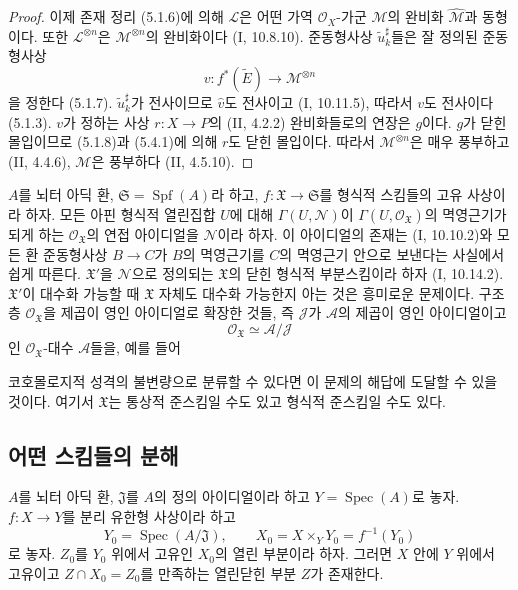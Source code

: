\begin{proof}
이제 존재 정리 (5.1.6)에 의해 $\mathcal L$은 어떤 가역
$\mathcal O_X$-가군 $\mathcal M$의 완비화
$\widehat{\mathcal M}$과 동형이다. 또한
$\mathcal L^{\otimes n}$은 $\mathcal M^{\otimes n}$의 완비화이다
(I, 10.8.10). 준동형사상 $\widetilde u_k^\sharp$들은 잘 정의된
준동형사상
\[
v:f^*(\widetilde E)\longrightarrow\mathcal M^{\otimes n}
\]
을 정한다 (5.1.7). $\widetilde u_k^\sharp$가 전사이므로
$\widehat v$도 전사이고 (I, 10.11.5), 따라서 $v$도 전사이다
(5.1.3). $v$가 정하는 사상 $r:X\to P$의 (II, 4.2.2)
완비화들로의 연장은 $g$이다. $g$가 닫힌 몰입이므로 (5.1.8)과
(5.4.1)에 의해 $r$도 닫힌 몰입이다. 따라서
$\mathcal M^{\otimes n}$은 매우 풍부하고 (II, 4.4.6),
$\mathcal M$은 풍부하다 (II, 4.5.10).
\end{proof}

\begin{remark}[5.4.6]
\label{III.5.4.6-fr}
$A$를 뇌터 아딕 환, $\mathfrak S=\operatorname{Spf}(A)$라 하고,
$f:\mathfrak X\to\mathfrak S$를 형식적 스킴들의 고유 사상이라
하자. 모든 아핀 형식적 열린집합 $U$에 대해
$\Gamma(U,\mathcal N)$이
$\Gamma(U,\mathcal O_{\mathfrak X})$의 멱영근기가 되게 하는
$\mathcal O_{\mathfrak X}$의 연접 아이디얼을 $\mathcal N$이라
하자. 이 아이디얼의 존재는 (I, 10.10.2)와 모든 환 준동형사상
$B\to C$가 $B$의 멱영근기를 $C$의 멱영근기 안으로 보낸다는
사실에서 쉽게 따른다. $\mathfrak X'$을 $\mathcal N$으로 정의되는
$\mathfrak X$의 닫힌 형식적 부분스킴이라 하자 (I, 10.14.2).
$\mathfrak X'$이 대수화 가능할 때 $\mathfrak X$ 자체도 대수화
가능한지 아는 것은 흥미로운 문제이다. 구조층
$\mathcal O_{\mathfrak X}$을 제곱이 영인 아이디얼로 확장한 것들,
즉 $\mathcal J$가 $\mathcal A$의 제곱이 영인 아이디얼이고
\[
\mathcal O_{\mathfrak X}\simeq\mathcal A/\mathcal J
\]
인 $\mathcal O_{\mathfrak X}$-대수 $\mathcal A$들을, 예를 들어


코호몰로지적 성격의 불변량으로 분류할 수 있다면 이 문제의 해답에
도달할 수 있을 것이다. 여기서 $\mathfrak X$는 통상적 준스킴일
수도 있고 형식적 준스킴일 수도 있다.
\end{remark}

\subsection{어떤 스킴들의 분해}
\label{subsection:III.5.5-fr}

\begin{proposition}[5.5.1]
\label{III.5.5.1-fr}
$A$를 뇌터 아딕 환, $\mathfrak J$를 $A$의 정의 아이디얼이라 하고
$Y=\operatorname{Spec}(A)$로 놓자. $f:X\to Y$를 분리 유한형
사상이라 하고
\[
Y_0=\operatorname{Spec}(A/\mathfrak J),\qquad
X_0=X\times_Y Y_0=f^{-1}(Y_0)
\]
로 놓자. $Z_0$를 $Y_0$ 위에서 고유인 $X_0$의 열린 부분이라
하자. 그러면 $X$ 안에 $Y$ 위에서 고유이고
$Z\cap X_0=Z_0$를 만족하는 열린닫힌 부분 $Z$가 존재한다.
\end{proposition}


